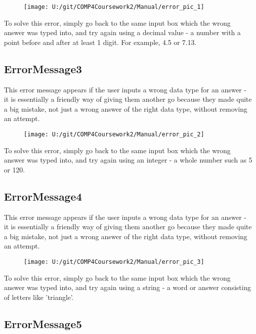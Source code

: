 \begin{figure}[H]
    \texttt{[image: U:/git/COMP4Coursework2/Manual/error\_pic\_1]}
\end{figure}

To solve this error, simply go back to the same input box which the wrong answer was typed into, and try again using a decimal value - a number with a point before and after at least 1 digit. For example, 4.5 or 7.13.

\subsection{ErrorMessage3}

This error message appears if the user inputs a wrong data type for an answer - it is essentially a friendly way of giving them another go because they made quite a big mistake, not just a wrong answer of the right data type, without removing an attempt.

\begin{figure}[H]
    \texttt{[image: U:/git/COMP4Coursework2/Manual/error\_pic\_2]}
\end{figure}

To solve this error, simply go back to the same input box which the wrong answer was typed into, and try again using an integer - a whole number such as 5 or 120.

\subsection{ErrorMessage4}

This error message appears if the user inputs a wrong data type for an answer - it is essentially a friendly way of giving them another go because they made quite a big mistake, not just a wrong answer of the right data type, without removing an attempt.

\begin{figure}[H]
    \texttt{[image: U:/git/COMP4Coursework2/Manual/error\_pic\_3]}
\end{figure}

To solve this error, simply go back to the same input box which the wrong answer was typed into, and try again using a string - a word or answer consisting of letters like 'triangle'.

\subsection{ErrorMessage5}

